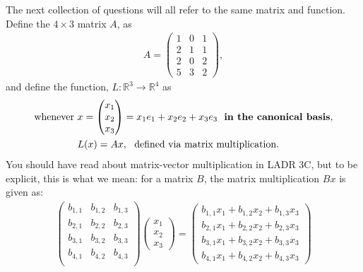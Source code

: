 \documentclass[12pt]{article}
\def\real{{\mathbb R}}
\newcommand{\ColVecThree}[3]{\begin{pmatrix} #1\\ #2\\ #3\end{pmatrix}}
\newcommand{\ColVecFour}[4]{\begin{pmatrix} #1\\ #2\\#3 \\ #4\end{pmatrix}}
\begin{document}
\noindent The next collection of questions will all refer to the same matrix and function. Define the $4\times3$ matrix $A$, as
	\begin{align}\label{eq:MatrixA}
		A = 
		 \begin{pmatrix}
		  1 & 0 & 1 \\
		  2 & 1 & 1 \\
		  2 & 0 & 2 \\
		  5 & 3 & 2 
		 \end{pmatrix},
	\end{align}
	and define the function, $L:\real^3\to\real^4$ as
	\begin{align}\label{eq:FunctionL}
		\text{whenever}\ &x = \ColVecThree{x_1}{x_2}{x_3} = x_1 e_1 + x_2 e_2 + x_3 e_3\ \ \text{\textbf{in the canonical basis}},\nonumber \\
		&L(x) = Ax,\ \ \text{defined via matrix multiplication}.
	\end{align}
	You should have read about matrix-vector multiplication in LADR 3C, but to be explicit, this is what we mean: for a matrix $B$, the matrix multiplication $Bx$ is given as:
	\begin{align*}
		\begin{pmatrix}
	     	  b_{1,1} & b_{1,2} & b_{1,3} \\
	     	  b_{2,1} & b_{2,2} & b_{2,3} \\
	     	  b_{3,1} & b_{3,2} & b_{3,3} \\
	     	  b_{4,1} & b_{4,2} & b_{4,3} \\
		\end{pmatrix}
		\begin{pmatrix}
			x_1\\
			x_2\\
			x_3
		\end{pmatrix}
		= 
		\ColVecFour{b_{1,1}x_1 + b_{1,2}x_2 + b_{1,3}x_3}
		{b_{2,1}x_1 + b_{2,2}x_2 + b_{2,3}x_3}
		{b_{3,1}x_1 + b_{3,2}x_2 + b_{3,3}x_3}
		{b_{4,1}x_1 + b_{4,2}x_2 + b_{4,3}x_3}
	\end{align*}
	
	
	\vspace{.5cm}
	
\end{document}
